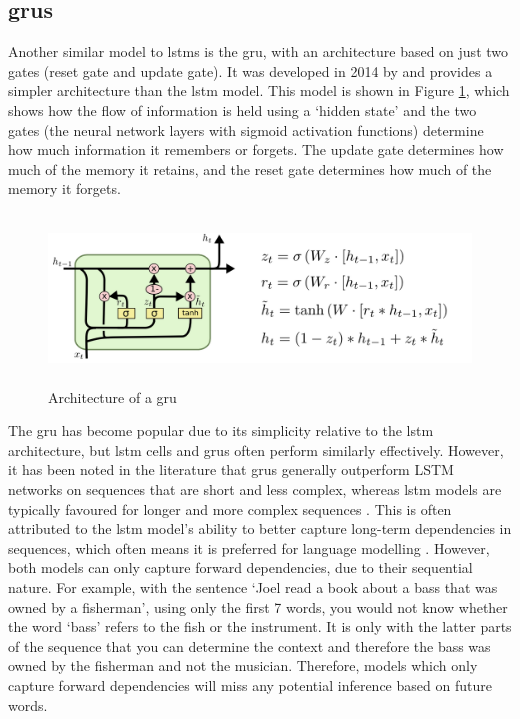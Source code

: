 \subsection{\acrlong{gru}s}
\label{sec:background_grus}
Another similar model to \acrshort{lstm}s is the \acrfull {gru}, with an architecture based on just two gates (reset gate and update gate). It was developed in 2014 by \citet{cho2014learning} and provides a simpler architecture than the \acrshort{lstm} model. This model is shown in Figure \ref{fig:gru_architecture}, which shows how the flow of information is held using a `hidden state' and the two gates (the neural network layers with sigmoid activation functions) determine how much information it remembers or forgets. The update gate determines how much of the memory it retains, and the reset gate determines how much of the memory it forgets.

\begin{figure}[h]
    \centering
    \includegraphics[height=4.5cm,trim={0 0 12cm 0cm},clip]{Paper/images/gru.png}
    \caption{Architecture of a \acrlong{gru} \citep{olah2015understanding}}
    \label{fig:gru_architecture}
\end{figure}

The \acrlong{gru} has become popular due to its simplicity relative to the \acrshort{lstm} architecture, but \acrlong{lstm} cells and \acrlong{gru}s often perform similarly effectively. However, it has been noted in the literature that \acrshort{gru}s generally outperform LSTM networks on sequences that are short and less complex, whereas \acrshort{lstm} models are typically favoured for longer and more complex sequences \citep{cahuantzi2023comparison}. This is often attributed to the \acrshort{lstm} model's ability to better capture long-term dependencies in sequences, which often means it is preferred for language modelling \citep{Irie2016}. However, both models can only capture forward dependencies, due to their sequential nature. For example, with the sentence `Joel read a book about a bass that was owned by a fisherman', using only the first 7 words, you would not know whether the word `bass' refers to the fish or the instrument. It is only with the latter parts of the sequence that you can determine the context and therefore the bass was owned by the fisherman and not the musician. Therefore, models which only capture forward dependencies will miss any potential inference based on future words. 

